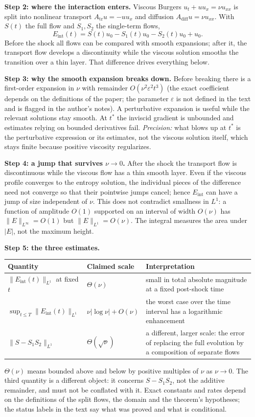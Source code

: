 \documentclass[11pt]{article}
\theoremstyle{plain}
\theoremstyle{definition}
\theoremstyle{remark}
\newcommand{\Eint}{E_{\mathrm{int}}}        %
\begin{document}
\medskip\textbf{Step 2: where the interaction enters.} Viscous Burgers $u_t+uu_x=\nu u_{xx}$ is split into nonlinear transport $A_{\mathrm{tr}}u=-uu_x$ and diffusion $A_{\mathrm{diff}}u=\nu u_{xx}$. With $S(t)$ the full flow and $S_1,S_2$ the single-term flows,
\[
\Eint(t)=S(t)u_0-S_1(t)u_0-S_2(t)u_0+u_0 .
\]
Before the shock all flows can be compared with smooth expansions; after it, the transport flow develops a discontinuity while the viscous solution smooths the transition over a thin layer. That difference drives everything below.

\medskip\textbf{Step 3: why the smooth expansion breaks down.} Before breaking there is a first-order expansion in $\nu$ with remainder $O(\nu^2\varepsilon^2t^3)$ (the exact coefficient depends on the definitions of the paper; the parameter $\varepsilon$ is not defined in the text and is flagged in the author's notes). A perturbative expansion is useful while the relevant solutions stay smooth. At $t^*$ the inviscid gradient is unbounded and estimates relying on bounded derivatives fail. \emph{Precision:} what blows up at $t^*$ is the perturbative expression or its estimates, not the viscous solution itself, which stays finite because positive viscosity regularizes.

\medskip\textbf{Step 4: a jump that survives $\nu\to0$.} After the shock the transport flow is discontinuous while the viscous flow has a thin smooth layer. Even if the viscous profile converges to the entropy solution, the individual pieces of the difference need not converge so that their pointwise jumps cancel; hence $\Eint$ can have a jump of size independent of $\nu$. This does not contradict smallness in $L^1$: a function of amplitude $O(1)$ supported on an interval of width $O(\nu)$ has $\|E\|_{L^\infty}=O(1)$ but $\|E\|_{L^1}=O(\nu)$. The integral measures the area under $|E|$, not the maximum height.

\medskip\textbf{Step 5: the three estimates.}
\begin{center}\small
\begin{tabular}{@{}L{4.3cm}L{3.0cm}L{6.6cm}@{}}
\toprule
Quantity & Claimed scale & Interpretation\\\midrule
$\|\Eint(t)\|_{L^1}$ at fixed $t$ & $\Theta(\nu)$ & small in total absolute magnitude at a fixed post-shock time\\
$\sup_{t\le T}\|\Eint(t)\|_{L^1}$ & $\nu|\log\nu|+O(\nu)$ & the worst case over the time interval has a logarithmic enhancement\\
$\|S-S_1S_2\|_{L^1}$ & $\Theta(\sqrt\nu)$ & a different, larger scale: the error of replacing the full evolution by a composition of separate flows\\
\bottomrule
\end{tabular}
\end{center}
$\Theta(\nu)$ means bounded above and below by positive multiples of $\nu$ as $\nu\to0$. The third quantity is a different object: it concerns $S-S_1S_2$, not the additive remainder, and must not be conflated with it. Exact constants and rates depend on the definitions of the split flows, the domain and the theorem's hypotheses; the status labels in the text say what was proved and what is conditional.
\end{document}
